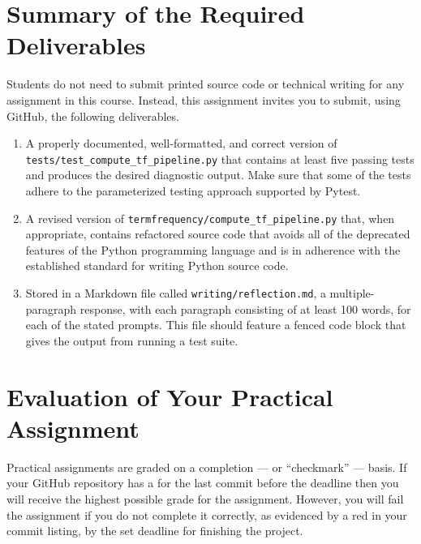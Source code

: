 \documentclass[11pt]{article}
\newcommand{\mainprogramsource}{\lstinline{termfrequency/compute_tf_pipeline.py}}
\newcommand{\testprogramsource}{\lstinline{tests/test_compute_tf_pipeline.py}}
\newcommand{\reflection}{\lstinline{writing/reflection.md}}
\newcommand{\checkmark}{\ding{51}}
\newcommand{\naughtmark}{\ding{55}}
\begin{document}
\section*{Summary of the Required Deliverables}

\noindent Students do not need to submit printed source code or technical
writing for any assignment in this course. Instead, this assignment invites you
to submit, using GitHub, the following deliverables.

\vspace*{-.25em}

\begin{enumerate}

\setlength{\itemsep}{0in}

\item A properly documented, well-formatted, and correct version of
  \testprogramsource{} that contains at least five passing tests and produces
  the desired diagnostic output. Make sure that some of the tests adhere to the
  parameterized testing approach supported by Pytest.

\item A revised version of \mainprogramsource{} that, when appropriate, contains
  refactored source code that avoids all of the deprecated features of the
  Python programming language and is in adherence with the established standard
  for writing Python source code.

\item Stored in a Markdown file called \reflection{}, a multiple-paragraph
  response, with each paragraph consisting of at least 100 words, for each of
  the stated prompts. This file should feature a fenced code block that gives
  the output from running a test suite.

\end{enumerate}

\vspace*{-1em}

\section*{Evaluation of Your Practical Assignment}

Practical assignments are graded on a completion --- or ``checkmark'' --- basis.
If your GitHub repository has a \checkmark{} for the last commit before the
deadline then you will receive the highest possible grade for the assignment.
However, you will fail the assignment if you do not complete it correctly, as
evidenced by a red \naughtmark{} in your commit listing, by the set deadline for
finishing the project.
\end{document}
